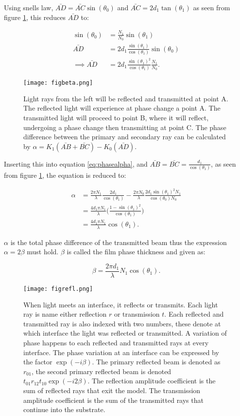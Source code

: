 \documentclass[MasterThesisMain.tex]{subfiles}
\begin{document}
Using snells law, $\bar{AD}=\bar{AC}\sin(\theta_0)$ and $\bar{AC}=2d_1\tan(\theta_1)$ as seen from figure \ref{fig:beta}, this reduces $\bar{AD}$ to:


\begin{align}
\sin(\theta_0) &= \frac{N_1}{N_0}\sin(\theta_1)\\
\bar{AD}&= 2d_1\frac{\sin(\theta_1)}{\cos(\theta_1)}\sin(\theta_0)\\
\implies \bar{AD}&= 2d_1\frac{\sin(\theta_1)^2}{\cos(\theta_1)}\frac{N_1}{N_0}.
\end{align}


\begin{figure}
\centering
\texttt{[image: figbeta.png]}
\caption{Light rays from the left will be reflected and transmitted at point A. The reflected light will experience at phase change a point A. The transmitted light will proceed to point B, where it will reflect, undergoing a phase change then transmitting at point C. The phase difference between the primary and secondary ray can be calculated by $\alpha = K_1(\bar{AB}+\bar{BC})-K_0(\bar{AD})$.}
\label{fig:beta}
\end{figure}  

Inserting this into equation \ref{eq:phasealpha}, and $\bar{AB}=\bar{BC}=\frac{d_1}{\cos(\theta_1)}$, as seen from figure \ref{fig:beta}, the equation is reduced to:

\begin{align}
\alpha &= \frac{2\pi N_1}{\lambda}\frac{2d_1}{\cos(\theta_1)}-\frac{2\pi N_0}{\lambda}\frac{2d_1 \sin(\theta_1)^2N_1}{\cos(\theta_0)N_0}\\
&= \frac{4d_1\pi N_1}{\lambda}\bigg(\frac{1-\sin(\theta_1)^2}{\cos(\theta_1)}\bigg)\\
&= \frac{4d_1\pi N_1}{\lambda}\cos(\theta_1).
\end{align}

$\alpha$ is the total phase difference of the transmitted beam thus the expression $\alpha=2\beta$ must hold. $\beta$ is called the film phase thickness and given as: 

\begin{equation}
\beta=\frac{2\pi d_1}{\lambda} N_1\cos(\theta_1).
\end{equation}  

\begin{figure}
\centering
\texttt{[image: figrefl.png]}
\caption{When light meets an interface, it reflects or transmits. Each light ray is name either reflection $r$ or transmission $t$. Each reflected and transmitted ray is also indexed with two numbers, these denote at which interface the light was reflected or transmitted. A variation of phase happens to each reflected and transmitted rays at every interface. The phase variation at an interface can be expressed by the factor $\exp(-i\beta)$. The primary reflected beam is denoted as $r_{01}$, the second primary reflected beam is denoted $t_{01}r_{12}t_{10}\exp(-i2\beta)$. The reflection amplitude coefficient is the sum of reflected rays that exit the model. The transmission amplitude coefficient is the sum of the transmitted rays that continue into the substrate.}
\label{fig:reflect}
\end{figure}
\end{document}
